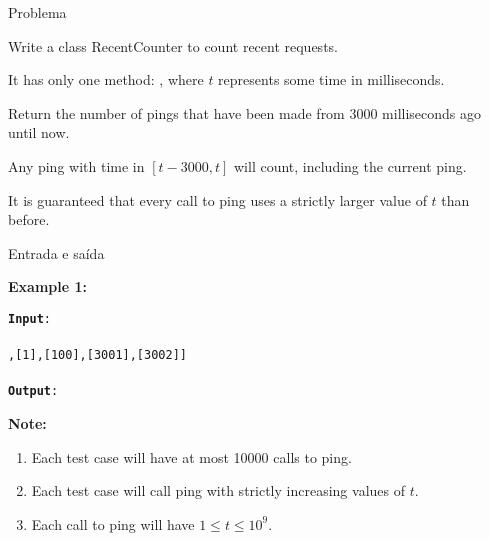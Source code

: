 
\begin{frame}[fragile]{Problema}

Write a class RecentCounter to count recent requests.

It has only one method: , where $t$ represents some time in milliseconds.

Return the number of pings that have been made from 3000 milliseconds ago until now.

Any ping with time in $[t - 3000, t]$ will count, including the current ping.

It is guaranteed that every call to ping uses a strictly larger value of $t$ than before.

\end{frame}

\begin{frame}[fragile]{Entrada e saída}

\textbf{Example 1:}

\begin{small}
\texttt{\noindent \textbf{Input}:\\
\\
\noindent [[],[1],[100],[3001],[3002]] \\ \\
\noindent \textbf{Output}:\\
\noindent [null,1,2,3,3] 
}
\end{small}

\vspace{0.1in}

\textbf{Note:}

\begin{enumerate}
    \item Each test case will have at most 10000 calls to ping.
    \item Each test case will call ping with strictly increasing values of $t$.
    \item Each call to ping will have $1 \leq t \leq 10^9$.
\end{enumerate}

\end{frame}

